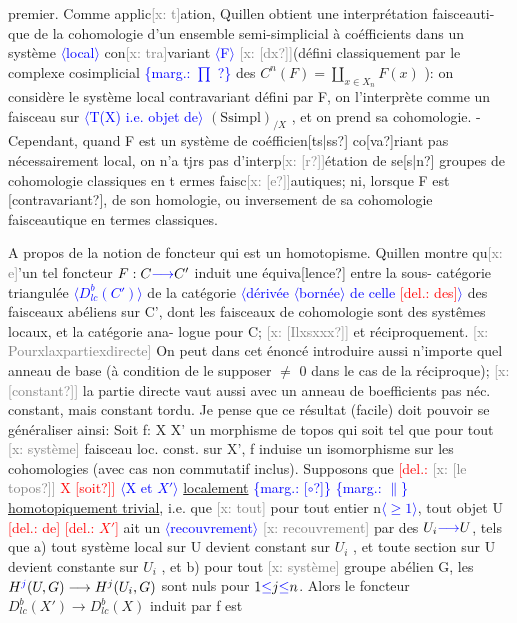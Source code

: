 \documentclass[11pt]{article}
\newcommand{\scanpage}[1]{\par\bigskip\noindent{\small\sffamily[scan #1]}\par}
\newcommand{\mspage}[1]{{\small\sffamily[p.\,#1]}}
\newcommand{\hand}[1]{\textcolor{blue}{#1}}
\newcommand{\inserted}[2][]{\textcolor{blue}{$\langle$#2$\rangle$}}
\newcommand{\margin}[1]{\textcolor{blue}{\{\textsf{marg.:} #1\}}}
\newcommand{\deleted}[1]{\textcolor{red}{[\textsf{del.:} #1]}}
\newcommand{\xout}[1]{\textcolor{gray}{[\textsf{x:} #1]}}
\newcommand{\uline}[1]{\underline{#1}}
\newcommand{\unsure}[1]{[#1?]}
\begin{document}
\mspage{\hand{33}}

\clearpage
\scanpage{162-5/34}
premier.  Comme applic\xout{t}ation, Quillen obtient une interprétation faisceauti-%
que de la cohomologie d'un ensemble semi-simplicial à coéfficients dans un
système \inserted{local} con\xout{tra}variant \inserted{F} \xout{\unsure{dx}}(défini classiquement par le complexe cosimplicial
\margin{$\prod$ ?} des  $C^n(F) = \coprod_{x\in X_n} F(x)$ ):  on considère le système local contravariant
défini par F, on l'interprète comme un faisceau sur \inserted[typed]{T(X) i.e. objet de} $(\mathrm{Ssimpl})_{/X}$ , et on
prend sa cohomologie. - Cependant, quand F est un système de coéfficien\unsure{ts|ss}
co\unsure{va}riant pas nécessairement local, on n'a tjrs pas d'interp\xout{\unsure{r}}étation de se\unsure{s|n}
groupes de cohomologie  classiques en t ermes faisc\xout{\unsure{e}}autiques; ni, lorsque F
est \unsure{contravariant}, de son homologie, ou inversement de sa cohomologie
faisceautique en termes classiques.

A propos de la notion de foncteur qui est un homotopisme. Quillen
montre qu\xout{e}'un tel foncteur $F: C \hand{\longrightarrow} C'$ induit une équiva\unsure{lence} entre la sous-%
catégorie triangulée \inserted{$D^b_{lc}(C')$} de la catégorie \inserted{dérivée \inserted{bornée} de celle \deleted{des}} des faisceaux abéliens  sur C', dont
les faisceaux de cohomologie sont des systêmes locaux, et la catégorie ana-%
logue pour C; \xout{\unsure{Ilxsxxx}}  et réciproquement. \xout{Pourxlaxpartiexdirecte} On peut
dans cet énoncé introduire aussi n'importe quel anneau de base (à condition
de le supposer $\neq$ 0 dans le cas de la réciproque); \xout{\unsure{constant}} la partie directe
vaut aussi avec un anneau de boefficients pas néc. constant, mais constant
tordu.  Je pense que ce résultat (facile) doit pouvoir se généraliser ainsi:
Soit  f: X \quad X' un morphisme de topos qui  soit tel que pour tout \xout{système}
faisceau loc. const. sur X', f induise un isomorphisme sur les cohomologies
(avec cas non commutatif inclus).  Supposons que \deleted{\xout{\unsure{le topos}} X \unsure{soit}} \inserted{X et $X'$} \uline{localement}
\margin{\unsure{$\circ$}} \margin{$\|$} \uline{homotopiquement trivial}, i.e. que \xout{tout} pour tout entier n\inserted{$\geq 1$}, tout objet U \deleted{de}
\deleted{$X'$} ait un \inserted[typed]{recouvrement} \xout{recouvrement} par des $U_i \hand{\longrightarrow} U$, tels que  a) tout système local sur U
devient constant sur $U_i$ , et toute section sur U devient constante sur $U_i$ ,
et  b)  pour tout \xout{système}  groupe abélien G, les $H^{\hand{j}}(U,G) \longrightarrow H^j(U_i,G)$ sont
nuls pour $1 \hand{\leq} j \hand{\leq} n$.  Alors le foncteur $D^b_{lc}(X') \longrightarrow D^b_{lc}(X)$  induit par f est
\end{document}
